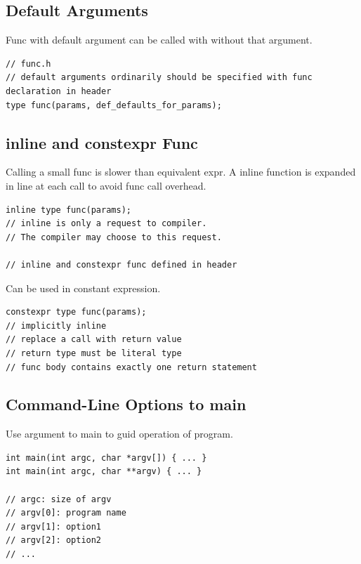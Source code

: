 \documentclass{blog}
\begin{document}
\subsection{Default Arguments}
\begin{definition}
    Func with default argument can be called with without that argument.
    \begin{verbatim}
// func.h
// default arguments ordinarily should be specified with func declaration in header
type func(params, def_defaults_for_params);
\end{verbatim}
\end{definition}

\subsection{inline and constexpr Func}
\begin{definition}
    Calling a small func is slower than equivalent expr.
    A inline function is expanded in line at each call to avoid func call overhead.
    \begin{verbatim}
inline type func(params);
// inline is only a request to compiler.
// The compiler may choose to this request.

// inline and constexpr func defined in header
\end{verbatim}
\end{definition}

\begin{definition}
    Can be used in constant expression.
    \begin{verbatim}
constexpr type func(params);
// implicitly inline
// replace a call with return value
// return type must be literal type
// func body contains exactly one return statement
\end{verbatim}
\end{definition}

\subsection{Command-Line Options to main}
\begin{definition}
    Use argument to main to guid operation of program.
    \begin{verbatim}
int main(int argc, char *argv[]) { ... }
int main(int argc, char **argv) { ... }

// argc: size of argv
// argv[0]: program name
// argv[1]: option1
// argv[2]: option2
// ...
\end{verbatim}
\end{definition}
\end{document}
